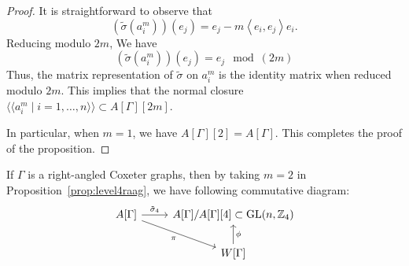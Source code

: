 \documentclass[12pt]{amsart}
\theoremstyle{definition}
\numberwithin{equation}{section}
\newcommand{\GL}{\mathrm{GL}}
\begin{document}
\begin{proof}
It is straightforward to observe that $$(\tilde{\sigma}(a_i^m))(e_j)=e_j-m\left\langle e_i, e_j\right\rangle e_i.$$
Reducing modulo $2m$, We have
$$
(\tilde{\sigma}(a_i^m))(e_j)=e_j \mod (2m)
$$
 Thus, the matrix representation of $\tilde{\sigma}$ on $a_i^m$ is the identity matrix when reduced modulo $2m$. This implies that the normal closure $\langle \langle a_i^m \mid i=1,\ldots, n \rangle\rangle\subset A[\Gamma][2m]$.

In particular, when $m = 1$, we have  $A[\Gamma][2]=A[\Gamma]$. This completes the proof of the proposition.
\end{proof}


If $\Gamma$ is a right-angled Coxeter graphs, then by taking $m=2$ in Proposition~\ref{prop:level4raag},  we have following commutative diagram:
$$\begin{tikzcd}
	{A[\Gamma]} & {{A[\Gamma]/A[\Gamma][4]\subset \GL(n,\mathbb Z_4)}} \\
	{} & {W[\Gamma]}
	\arrow["{\tilde{\sigma}_4}", from=1-1, to=1-2]
	\arrow["\pi"', from=1-1, to=2-2]
	\arrow["\phi"', from=2-2, to=1-2]
\end{tikzcd}
$$
\end{document}
